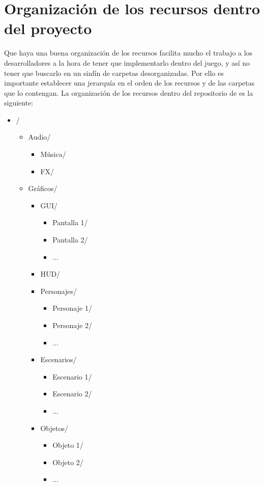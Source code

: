  \section{Organización de los recursos dentro del proyecto}
    Que haya una buena organización de los recursos facilita mucho el trabajo a los desarrolladores a la hora de tener que implementarlo dentro del juego, y así no tener que buscarlo en un sinfín de carpetas desorganizadas. Por ello es importante establecer una jerarquía en el orden de los recursos y de las carpetas que lo contengan. La organización de los recursos dentro del repositorio de \nombrejuego es la siguiente:
    
    \begin{itemize}
    \item {}/
        \begin{itemize}
        \item Audio/
            \begin{itemize}
            \item Música/
            \item FX/
            \end{itemize}
        \item Gráficos/
            \begin{itemize}
            \item GUI/
                \begin{itemize}
                \item Pantalla 1/
                \item Pantalla 2/
                \item ...
                \end{itemize}
            \item HUD/
            \item Personajes/
                \begin{itemize}
                \item Personaje 1/
                \item Personaje 2/
                \item ...
                \end{itemize}
            \item Escenarios/
                \begin{itemize}
                \item Escenario 1/
                \item Escenario 2/
                \item ...
                \end{itemize}
            \item Objetos/
                \begin{itemize}
                \item Objeto 1/
                \item Objeto 2/
                \item ...
                \end{itemize}
            \end{itemize}
        \end{itemize}
    \end{itemize}
    
